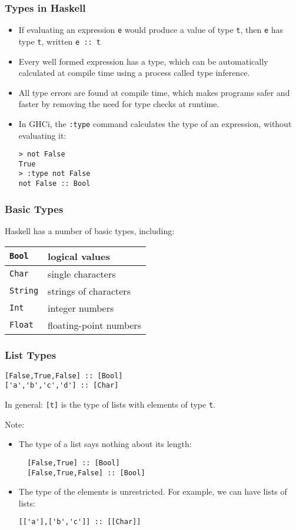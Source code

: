 \begin{multicols}{2}
\subsubsection{Types in Haskell}
\begin{itemize}
  \item If evaluating an expression \lstinline{e} would produce a value of type \lstinline{t}, then \lstinline{e} has type \lstinline{t}, written \lstinline{e :: t}
  \item Every well formed expression has a type, which can be automatically calculated at compile time using a process called type inference.
  \item All type errors are found at compile time, which makes programs safer and faster by removing the need for type checks at runtime.
  \item In GHCi, the \lstinline{:type} command calculates the type of an expression, without evaluating it:
\begin{lstlisting}
> not False
True
> :type not False
not False :: Bool
\end{lstlisting}
\end{itemize}

\subsubsection{Basic Types}
Haskell has a number of basic types, including:
\begin{tabularx}{\linewidth}{|X|X|}
  \hline
  \lstinline|Bool| & logical values \\
  \hline
  \lstinline|Char| & single characters \\
  \hline
  \lstinline|String| & strings of characters \\
  \hline
  \lstinline|Int| & integer numbers \\
  \hline
  \lstinline|Float| & floating-point numbers \\
  \hline
\end{tabularx}

\subsubsection{List Types}
\begin{lstlisting}
[False,True,False] :: [Bool]
['a','b','c','d'] :: [Char]
\end{lstlisting}
In general: \lstinline{[t]} is the type of lists with elements of type \lstinline{t}.

Note:
\begin{itemize}
  \item The type of a list says nothing about its length:
\begin{lstlisting}
  [False,True] :: [Bool]
  [False,True,False] :: [Bool]
\end{lstlisting}
  \item The type of the elements is unrestricted. For example, we can have lists of lists:
\begin{lstlisting}
[['a'],['b','c']] :: [[Char]]
\end{lstlisting}
\end{itemize}


\end{multicols}
